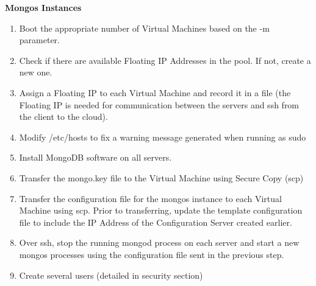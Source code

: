 \documentclass[9pt,twocolumn,twoside]{styles/osajnl}
\begin{document}
\textbf{Mongos Instances}
\vspace{-\topsep}
\begin{enumerate}
\item Boot the appropriate number of Virtual Machines based on the -m parameter.
\item Check if there are available Floating IP Addresses in the pool.  If not, create a new one.
\item Assign a Floating IP to each Virtual Machine and record it in a file (the Floating IP is needed for communication between the servers and ssh from the client to the cloud).
\item Modify /etc/hosts to fix a warning message generated when running as sudo
\item Install MongoDB software on all servers.
\item Transfer the mongo.key file to the Virtual Machine using Secure Copy (scp)
\item Transfer the configuration file for the mongos instance to each Virtual Machine using scp.  Prior to transferring, update the template configuration file to include the IP Address of the Configuration Server created earlier.
\item Over ssh, stop the running mongod process on each server and start a new mongos processes using the configuration file sent in the previous step.
\item Create several users (detailed in security section)
\end{enumerate}
\vspace{-\topsep}
\end{document}
